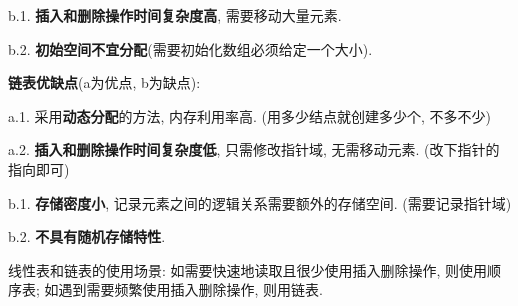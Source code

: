 \documentclass[12pt, a4paper, oneside]{ctexart}
\def\bf{\textbf}
\begin{document}
b.1. \bf{插入和删除操作时间复杂度高}, 需要移动大量元素.

b.2. \bf{初始空间不宜分配}(需要初始化数组必须给定一个大小).

\bf{链表优缺点}(a为优点, b为缺点): 

a.1. 采用\bf{动态分配}的方法, 内存利用率高. (用多少结点就创建多少个, 不多不少)

a.2. \bf{插入和删除操作时间复杂度低}, 只需修改指针域, 无需移动元素. (改下指针的指向即可)

b.1. \bf{存储密度小}, 记录元素之间的逻辑关系需要额外的存储空间. (需要记录指针域)

b.2. \bf{不具有随机存储特性}.

线性表和链表的使用场景: 如需要快速地读取且很少使用插入删除操作, 则使用顺序表; 如遇到需要频繁使用插入删除操作, 则用链表.

\end{document}
